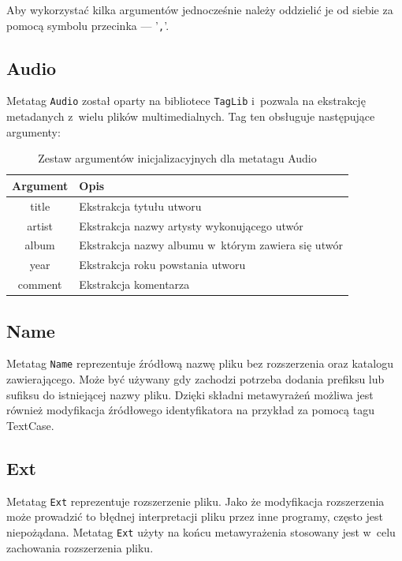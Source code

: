 Aby wykorzystać kilka argumentów jednocześnie należy oddzielić je od siebie za pomocą symbolu przecinka --- '\texttt{,}'.

\subsection{Audio}
\par
Metatag \texttt{Audio} został oparty na bibliotece \texttt{TagLib} i~pozwala na ekstrakcję metadanych z~wielu plików multimedialnych.
Tag ten obsługuje następujące argumenty:
\begin{table}[h]
\begin{center}
\begin{tabular}{| c | p{13cm} |}
\hline
\textbf{Argument} & \textbf{Opis} \\
\hline
title & Ekstrakcja tytułu utworu \\
artist & Ekstrakcja nazwy artysty wykonującego utwór \\
album & Ekstrakcja nazwy albumu w~którym zawiera się utwór \\
year & Ekstrakcja roku powstania utworu \\
comment & Ekstrakcja komentarza \\
\hline

\end{tabular}
\caption{Zestaw argumentów inicjalizacyjnych dla metatagu \textsf{Audio}}
\end{center}
\end{table}

\subsection{Name}
\par
Metatag \texttt{Name} reprezentuje źródłową nazwę pliku bez rozszerzenia oraz katalogu zawierającego. Może być używany gdy zachodzi potrzeba dodania prefiksu lub sufiksu do istniejącej nazwy pliku. Dzięki składni metawyrażeń możliwa jest również modyfikacja źródłowego identyfikatora na przykład za pomocą tagu TextCase.

\subsection{Ext}
\par
Metatag \texttt{Ext} reprezentuje rozszerzenie pliku. Jako że modyfikacja rozszerzenia może prowadzić to błędnej interpretacji pliku przez inne programy, często jest niepożądana. Metatag \texttt{Ext} użyty na końcu metawyrażenia stosowany jest w~celu zachowania rozszerzenia pliku.

